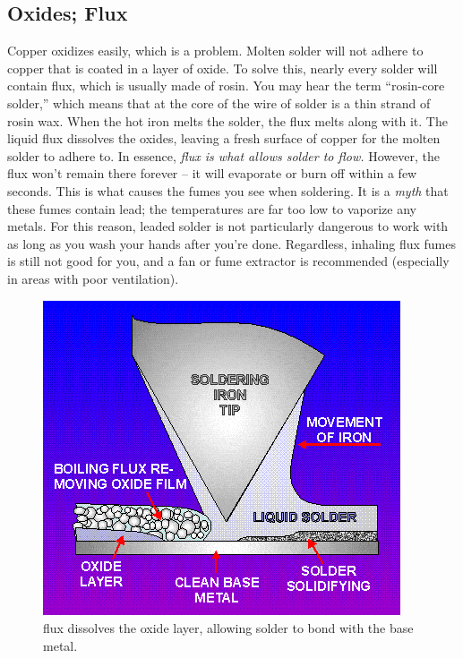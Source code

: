 \subsection{Oxides; Flux}
Copper oxidizes easily, which is a problem. Molten solder will not adhere to copper that is coated in a layer of oxide. To solve this, nearly every solder will contain flux, which is usually made of rosin. You may hear the term ``rosin-core solder,'' which means that at the core of the wire of solder is a thin strand of rosin wax. When the hot iron melts the solder, the flux melts along with it. The liquid flux dissolves the oxides, leaving a fresh surface of copper for the molten solder to adhere to. In essence, \emph{flux is what allows solder to flow.} However, the flux won’t remain there forever – it will evaporate or burn off within a few seconds. This is what causes the fumes you see when soldering. It is a \emph{myth} that these fumes contain lead; the temperatures are far too low to vaporize any metals. For this reason, leaded solder is not particularly dangerous to work with as long as you wash your hands after you’re done. Regardless, inhaling flux fumes is still not good for you, and a fan or fume extractor is recommended (especially in areas with poor ventilation).
\begin{figure}[h]
    \caption{flux dissolves the oxide layer, allowing solder to bond with the base metal.}
    \centering \includegraphics[scale=0.75]{images/oxidation_diagram.jpg}
\end{figure}

